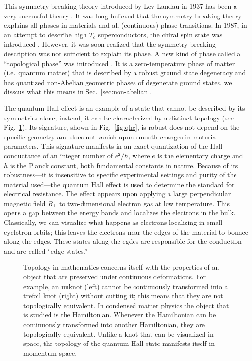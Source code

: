 This symmetry-breaking theory introduced by Lev Landau in 1937 has been a very successful theory \cite{Landau1937}.  %
It was long believed that the symmetry breaking theory explains all phases in materials and all (continuous) phase transitions.
In 1987, in an attempt to describe high $T_c$ superconductors, the chiral spin state was introduced \cite{Kalmeyer1987}.
However, it was soon realized that the symmetry breaking description was not sufficient to explain its phase.
A new kind of phase called a ``topological phase'' was introduced \cite{Wen1989,XiaoGang1990}.
It is a zero-temperature phase of matter (i.e.~quantum matter) that is described by a robust ground state degeneracy and has quantized non-Abelian geometric phases of degenerate ground states, we disscus what this means in Sec.~\ref{sec:non-abelian}.

The quantum Hall effect is an example of a state that cannot be described by its symmetries alone; instead, it can be characterized by a distinct topology (see Fig.~\ref{fig:knots}).  %
Its signature, shown in Fig.~\ref{fig:qhe}, is robust does not depend on the specific geometry and does not vanish upon smooth changes in material parameters.
This signature manifests in an exact quantization of the Hall conductance of an integer number of $e^2/h$, where $e$ is the elementary charge and $h$ is the Planck constant, both fundamental constants in nature.
Because of its robustness---it is insensitive to specific experimental settings and purity of the material used---the quantum Hall effect is used to determine the standard for electrical resistance. %
The effect appears upon applying a large perpendicular magnetic field $B_\perp$ to two-dimensional electron gas at low temperature.
This opens a gap between the energy bands and localizes the electrons in the bulk.
Classically, we can visualize what happens as electrons localizing in small cyclotron orbits; this leaves the electrons near the edges of the material to bounce along the edges.
These states along the egdes are responsible for the conduction and are called ``edge states.''

\begin{figure}[!htb]
\centering
\caption{
Topology in mathematics concerns itself with the properties of an object that are preserved under continuous deformations.
For example, an unknot (left) cannot be continuously transformed into a trefoil knot (right) without cutting it; this means that they are not topologically equivalent.
In condensed matter physics the object that is studied is the Hamiltonian.
Whenever the Hamiltonian can be continuously transformed into another Hamiltonian, they are topologically equivalent.
Unlike a knot that can be visualized in space, the topology of the quantum Hall state manifests itself in momentum space.
\label{fig:knots}}
\end{figure}

